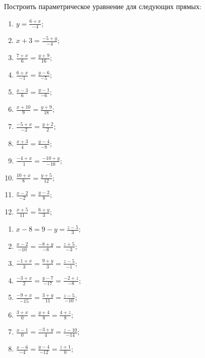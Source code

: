 	\vspace{15pt}
	Построить параметрическое уравнение для следующих прямых:

	\begin{multicols}{2}
		\begin{enumerate}
			\setcounter{enumi}{\value{tasks}}
				
				\item \( \displaystyle y = \frac{6+x}{-4} \);
				\item \( \displaystyle x + 3 = \frac{-5+y}{-4} \);
				\item \( \displaystyle \frac{7+x}{6} = \frac{y+9}{16} \);
				\item \( \displaystyle \frac{6+x}{-1} = \frac{y-6}{-5} \);
				\item \( \displaystyle \frac{x-3}{6} = \frac{y-1}{-6} \);
				\item \( \displaystyle \frac{x+10}{9} = \frac{y+9}{18} \);
				\item \( \displaystyle \frac{-5+x}{-2} = \frac{y+2}{2} \);
				\item \( \displaystyle \frac{x+3}{4} = \frac{y-4}{-8} \);
				\item \( \displaystyle \frac{-4+x}{1} = \frac{-10+y}{-10} \);
				\item \( \displaystyle \frac{10+x}{8} = \frac{y+5}{12} \);
				\item \( \displaystyle \frac{x-2}{-2} = \frac{y-2}{8} \);
				\item \( \displaystyle \frac{x+5}{11} = \frac{6+y}{3} \);

			\setcounter{tasks}{\value{enumi}}
		\end{enumerate}
	\end{multicols}

	\vspace{10pt}
	\begin{multicols}{2}
		\begin{enumerate}
			\setcounter{enumi}{\value{tasks}}

				\item \( \displaystyle x-8 = 9-y = \frac{z-5}{3} \);
				\item \( \displaystyle \frac{x-2}{-10} = \frac{-8+y}{-8} = \frac{z+5}{-3} \);
				\item \( \displaystyle \frac{-1+x}{3} = \frac{9+y}{3} = \frac{z-5}{-1} \);
				\item \( \displaystyle \frac{-3+x}{2} = \frac{y-7}{-17} = \frac{-2+z}{-8} \);
				\item \( \displaystyle \frac{-9+x}{-15} = \frac{3+y}{11} = \frac{z-5}{-10} \);
				\item \( \displaystyle \frac{3+x}{0} = \frac{y+4}{8} = \frac{4+z}{8} \);
				\item \( \displaystyle \frac{x-1}{0} = \frac{-3+y}{4} = \frac{z-10}{-14} \);
				\item \( \displaystyle \frac{x-6}{-4} = \frac{y-4}{-12} = \frac{z+1}{0} \);

			\setcounter{tasks}{\value{enumi}}
		\end{enumerate}
	\end{multicols}


